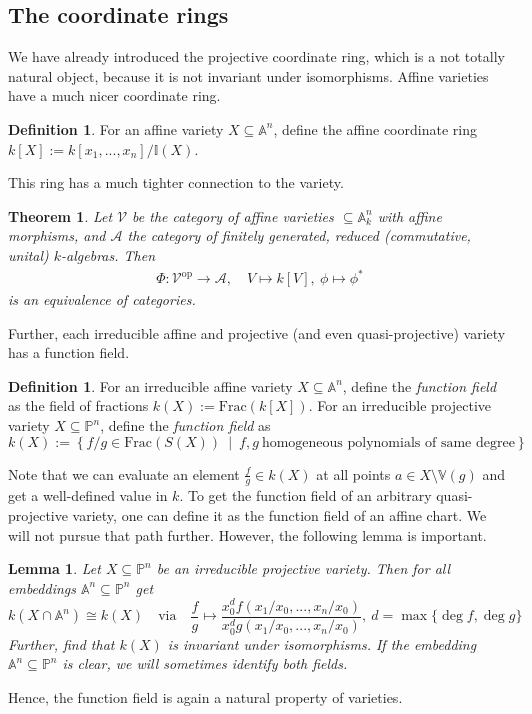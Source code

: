 \documentclass{scrartcl}
\newcommand{\I}{\mathbb{I}}
\newcommand{\V}{\mathbb{V}}
\newcommand{\Aff}{\mathbb{A}}
\newcommand{\Proj}{\mathbb{P}}
\newtheorem{theorem}[prop]{Theorem}
\newtheorem{lemma}[prop]{Lemma}
\theoremstyle{definition}
\newtheorem{definition}[prop]{Definition}
\begin{document}
\subsection{The coordinate rings}
We have already introduced the projective coordinate ring, which is a not totally natural object, because it is not invariant under isomorphisms.
Affine varieties have a much nicer coordinate ring.
\begin{definition}
    For an affine variety $X \subseteq \Aff^n$, define the affine coordinate ring $k[X] := k[x_1, ..., x_n] / \I(X)$.
\end{definition}
This ring has a much tighter connection to the variety.
\begin{theorem}
    \label{prop:equivalence_of_categories}
    Let $\mathcal{V}$ be the category of affine varieties $\subseteq \Aff_k^n$ with affine morphisms, and $\mathcal{A}$ the category of finitely generated, reduced (commutative, unital) $k$-algebras.
    Then
    \begin{align*}
        \Phi: \mathcal{V}^{\mathrm{op}} \to \mathcal{A}, \quad V \mapsto k[V], \ \phi \mapsto \phi^*
    \end{align*}
    is an equivalence of categories.
\end{theorem}
Further, each irreducible affine and projective (and even quasi-projective) variety has a function field.
\begin{definition}
    For an irreducible affine variety $X \subseteq \Aff^n$, define the \emph{function field} as the field of fractions $k(X) := \mathrm{Frac}(k[X])$.
    For an irreducible projective variety $X \subseteq \Proj^n$, define the \emph{function field} as
    \begin{equation*}
        k(X) := \left\{ f/g \in \mathrm{Frac}(S(X)) \ \middle| \ f, g \ \text{homogeneous polynomials of same degree} \right\}
    \end{equation*}
\end{definition}
Note that we can evaluate an element $\frac f g \in k(X)$ at all points $a \in X \setminus \V(g)$ and get a well-defined value in $k$.
To get the function field of an arbitrary quasi-projective variety, one can define it as the function field of an affine chart.
We will not pursue that path further.
However, the following lemma is important.
\begin{lemma}
    Let $X \subseteq \Proj^n$ be an irreducible projective variety. Then for all embeddings $\Aff^n \subseteq \Proj^n$ get
    \begin{equation*}
        k(X \cap \Aff^n) \cong k(X) \quad \text{via} \quad \frac f g \mapsto \frac {x_0^d f({x_1} / {x_0}, ..., {x_n} / {x_0})} {x_0^d g({x_1} / {x_0}, ..., {x_n} / {x_0})}, \ d = \max \{\deg f, \deg g\}
    \end{equation*}
    Further, find that $k(X)$ is invariant under isomorphisms.
    If the embedding $\Aff^n \subseteq \Proj^n$ is clear, we will sometimes identify both fields.
\end{lemma}
Hence, the function field is again a natural property of varieties.
\end{document}
